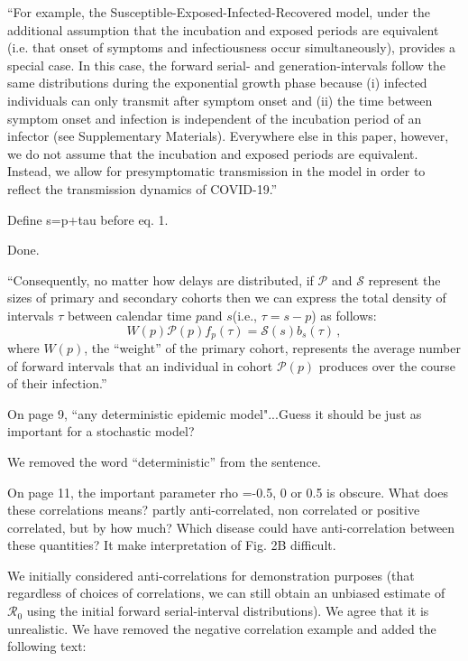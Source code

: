 \documentclass[12pt]{article}
\newcommand{\Ro}{\ensuremath{{\mathcal R}_{0}}\xspace}
\newcommand{\revtext}{\textsf}
\newcommand{\psymp}{\ensuremath{p}} %
\newcommand{\ssymp}{\ensuremath{s}} %
\newcommand{\psize}{{\mathcal P}} %
\newcommand{\ssize}{{\mathcal S}} %
\begin{document}
``For example, the Susceptible-Exposed-Infected-Recovered model, under the additional assumption that the incubation and exposed periods are equivalent (i.e. that onset of symptoms and infectiousness occur simultaneously), provides a special case.
In this case, the forward serial- and generation-intervals follow the same distributions during the exponential growth phase because (i) infected individuals can only transmit after symptom onset and (ii) the time between symptom onset and infection is independent of the incubation period of an infector (see Supplementary Materials).
Everywhere else in this paper, however, we do not assume that the incubation and exposed periods are equivalent.
Instead, we allow for presymptomatic transmission in the model in order to reflect the transmission dynamics of COVID-19.''

\revtext{Define s=p+tau before eq. 1.}

Done.

``Consequently, no matter how delays are distributed, if
$\mathcal P$ and $\mathcal S$ represent the sizes of primary and
secondary cohorts then we can express the total density of intervals $\tau$ between calendar time \psymp and \ssymp (i.e., $\tau=\ssymp-\psymp$) as follows:
\begin{equation}
W(\psymp) \psize(\psymp) f_\psymp(\tau) = \ssize(\ssymp) b_\ssymp(\tau) \,,
\end{equation}
where $W(\psymp)$, the ``weight'' of the primary cohort, represents the average number of forward intervals that an individual in cohort $\psize(\psymp)$ produces over the course of their infection.''

\revtext{On page 9, ``any deterministic epidemic model"...Guess it should be just as important for a stochastic model?}

We removed the word ``deterministic'' from the sentence.

\revtext{On page 11, the important parameter rho =-0.5, 0 or 0.5 is obscure. What does these correlations means? partly anti-correlated, non correlated or positive correlated, but by how much? Which disease could have anti-correlation between these quantities? It make interpretation of Fig. 2B difficult. }

We initially considered anti-correlations for demonstration purposes (that regardless of choices of correlations, we can still obtain an unbiased estimate of \Ro using the initial forward serial-interval distributions). We agree that it is unrealistic. We have removed the negative correlation example and added the following text:
\end{document}
